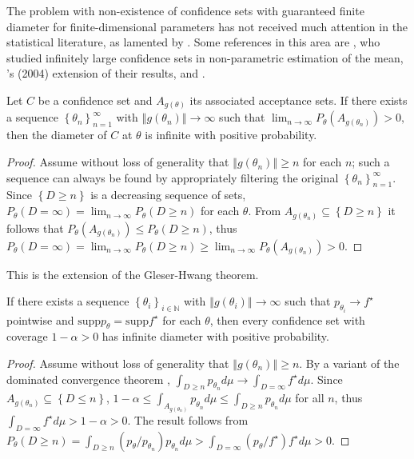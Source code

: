 \documentclass[twoside]{article}
\begin{document}
The problem with non-existence
of confidence sets with guaranteed finite diameter for finite-dimensional
parameters has not received much attention in the statistical literature,
as lamented by \citet{gleser996bootstrap}. Some references in this
area are \citet{bahadur1956nonexistence}, who studied infinitely
large confidence sets in non-parametric estimation of the mean, \citeauthor{romano2004non}'s
(2004) extension of their results, \citet{Donoho1988-hg} and \citet{Pfanzagl1998-fe}.
\begin{lem}
Let $C$ be a confidence set and $A_{g(\theta)}$ its associated
acceptance sets. If there exists a sequence $\left\{ \theta_{n}\right\} _{n=1}^{\infty}$
with $\left\Vert g(\theta_{n})\right\Vert \to\infty$ such
that $\lim_{n\to\infty}P_{\theta}(A_{g(\theta_{n})})>0,$then
the diameter of $C$ at $\theta$ is infinite with positive probability.
\end{lem}
\begin{proof}
Assume without loss of generality that $\left\Vert g(\theta_{n})\right\Vert \geq n$
for each $n$; such a sequence can always be found by appropriately
filtering the original $\left\{ \theta_{n}\right\} _{n=1}^{\infty}$.
Since $\left\{ D\geq n\right\} $ is a decreasing sequence of sets,
$P_{\theta}(D=\infty)=\lim_{n\to\infty}P_{\theta}(D\geq n)$
for each $\theta$. From $A_{g(\theta_{n})}\subseteq\left\{ D\geq n\right\} $
it follows that $P_{\theta}(A_{g(\theta_{n})})\leq P_{\theta}(D\geq n)$,
thus $P_{\theta}(D=\infty)=\lim_{n\to\infty}P_{\theta}(D\geq n)\geq\lim_{n\to\infty}P_{\theta}(A_{g(\theta_{n})})>0$.
\end{proof}
This is the extension of the Gleser-Hwang theorem.
\begin{thm}
\label{thm:Infinite diameter main theorem}If there exists a sequence
$\left\{ \theta_{i}\right\} _{i\in\mathbb{N}}$ with $\left\Vert g(\theta_{i})\right\Vert \to\infty$
such that $p_{\theta_{i}}\to f^{\star}$ pointwise and $\textrm{supp}p_{\theta}=\textrm{supp}f^{\star}$
for each $\theta$, then every confidence set with coverage $1-\alpha>0$
has infinite diameter with positive probability.
\end{thm}
\begin{proof}
Assume without loss of generality that $\left\Vert g(\theta_{n})\right\Vert \geq n$.
By a variant of the dominated convergence theorem \citep[exercise 16.4a]{billingsley1995probability}, $\int_{D\geq n}p_{\theta_{n}}d\mu\to\int_{D=\infty}f^{\star}d\mu$.
Since $A_{g(\theta_{n})}\subseteq\left\{ D\leq n\right\} $,
$1-\alpha\leq\int_{A_{g(\theta_{n})}}p_{\theta_{n}}d\mu\leq\int_{D\geq n}p_{\theta_{n}}d\mu$
for all $n$, thus $\int_{D=\infty}f^{\star}d\mu>1-\alpha>0$. The
result follows from $P_{\theta}(D\geq n)=\int_{D\geq n}(p_{\theta}/p_{\theta_{n}})p_{\theta_{n}}d\mu>\int_{D=\infty}(p_{\theta}/f^{\star})f^{\star}d\mu>0$.
\end{proof}
\end{document}
